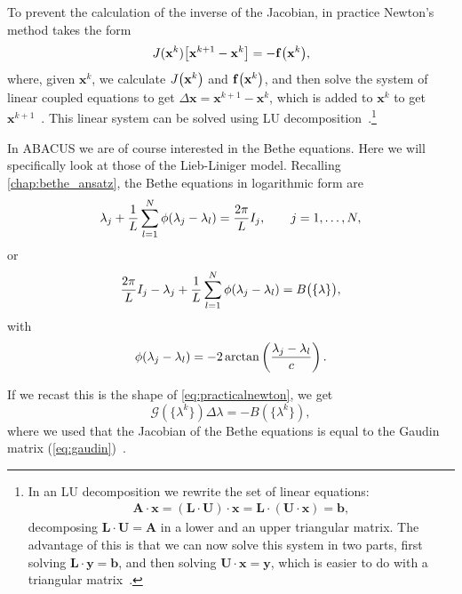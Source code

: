 \documentclass[11pt, a4paper]{report} %
\begin{document}
To prevent the calculation of the inverse of the Jacobian, in practice Newton's method takes the form
\begin{equation}\label{eq:practicalnewton}
  J(\mathbf{x}^k)\qty[\mathbf{x}^{k+1} - \mathbf{x}^k] = - \mathbf{f}\qty(\mathbf{x}^k),
\end{equation}
where, given \(\mathbf{x}^k\), we calculate \(J\qty(\mathbf{x}^k)\) and \( \mathbf{f}\qty(\mathbf{x}^k)\), and then solve the system of linear coupled equations to get \(\Delta\mathbf{x}=\mathbf{x}^{k+1} - \mathbf{x}^k\), which is added to \(\mathbf{x}^k\) to get \(\mathbf{x}^{k+1}\)~\cite{Sueli2003}. 
This linear system can be solved using LU decomposition~\cite{Press2007}.\footnote{In an LU decomposition we rewrite the set of linear equations:
  \begin{align}
    \label{eq:54}
    \mathbf{A}\cdot\mathbf{x} = (\mathbf{L}\cdot\mathbf{U}) \cdot \mathbf{x} =\mathbf{L}\cdot(\mathbf{U} \cdot \mathbf{x}) = \mathbf{b},
  \end{align}
decomposing \(\mathbf{L}\cdot\mathbf{U} = \mathbf{A}\) in a lower and an upper triangular matrix.
The advantage of this is that we can now solve this system in two parts, first solving \(\mathbf{L}\cdot\mathbf{y} = \mathbf{b}\), and then solving \(\mathbf{U}\cdot\mathbf{x} = \mathbf{y}\), which is easier to do with a triangular matrix~\cite{Press2007}.
}

In ABACUS we are of course interested in the Bethe equations.
Here we will specifically look at those of the Lieb-Liniger model.
Recalling \cref{chap:bethe_ansatz}, the Bethe equations in logarithmic form are 
\begin{align}
  \lambda_j + \frac{1}{L} \sum_{l=1}^N \phi\qty(\lambda_j - \lambda_l) = \frac{2\pi}{L}I_j, \qquad j = 1,\ldots,N,
\end{align}
or
\begin{align}
  \frac{2\pi}{L}I_j - \lambda_j + \frac{1}{L} \sum_{l=1}^N \phi\qty(\lambda_j - \lambda_l) = B\qty\big(\{\lambda\}),
\end{align}
with
\begin{equation}
  \phi\qty(\lambda_j - \lambda_l) = -2\arctan\left(\frac{\lambda_j-\lambda_l}{c}\right).
\end{equation}

If we recast this is the shape of \cref{eq:practicalnewton}, we get
\begin{equation}
  \mathcal{G}(\{\lambda^k\}) \Delta \lambda = -B(\{\lambda^k\}),
\end{equation}
where we used that the Jacobian of the Bethe equations is equal to the Gaudin matrix (\cref{eq:gaudin})~\cite{Caux2009}.
\end{document}
